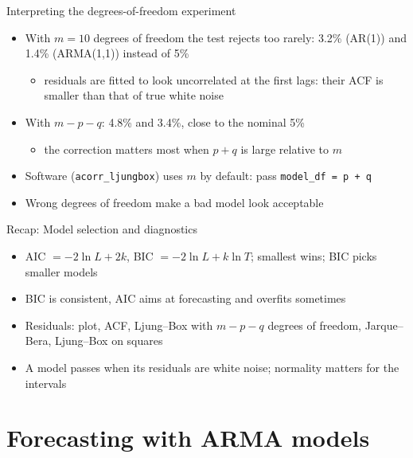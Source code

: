 \begin{frame}{Interpreting the degrees-of-freedom experiment}
\itemsize{\small}
\begin{itemize}
    \item With $m = 10$ degrees of freedom the test rejects too rarely: 3.2\% (AR(1)) and 1.4\% (ARMA(1,1)) instead of 5\%
    \begin{itemize}
        \item residuals are fitted to look uncorrelated at the first lags: their ACF is smaller than that of true white noise
    \end{itemize}
    \item With $m - p - q$: 4.8\% and 3.4\%, close to the nominal 5\%
    \begin{itemize}
        \item the correction matters most when $p + q$ is large relative to $m$
    \end{itemize}
    \item Software (\texttt{acorr\_ljungbox}) uses $m$ by default: pass \texttt{model\_df = p + q}
    \item Wrong degrees of freedom make a bad model look acceptable
\end{itemize}
\end{frame}

\begin{frame}{Recap: Model selection and diagnostics}
\itemsize{\small}
\begin{itemize}
    \item AIC $= -2\ln L + 2k$, BIC $= -2\ln L + k\ln T$; smallest wins; BIC picks smaller models
    \item BIC is consistent, AIC aims at forecasting and overfits sometimes
    \item Residuals: plot, ACF, Ljung--Box with $m - p - q$ degrees of freedom, Jarque--Bera, Ljung--Box on squares
    \item A model passes when its residuals are white noise; normality matters for the intervals
\end{itemize}
\end{frame}


\section{Forecasting with ARMA models}

